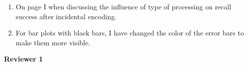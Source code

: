 \documentclass[12pt]{article}
\begin{document}
\begin{enumerate}
\item
	On page \pageref{newcite} I  when discussing the influence of type of processing on recall success after incidental encoding.

\item
	For bar plots with black bars, I have changed the color of the error bars to make them more visible. 


\end{enumerate}


\vspace{20pt}

\textbf{\large{Reviewer 1}}
\end{document}

